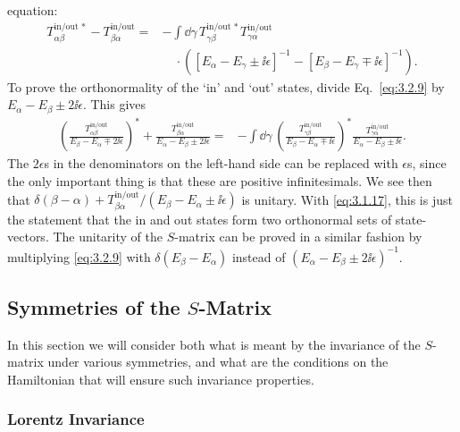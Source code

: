 
equation:
\begin{align}
T_{\alpha\beta}^{\mathrm{in/out}\,*}-T_{\beta\alpha}^{\mathrm{in/out}}
={}&-\int \dd\gamma\,T_{\gamma\beta}^{\mathrm{in/out}\,*}T_{\gamma\alpha}^{\mathrm{in/out}}
\nonumber\\
&\quad\cdot\left([E_\alpha-E_\gamma\pm \ii\epsilon]^{-1}
-[E_\beta-E_\gamma\mp \ii\epsilon]^{-1}\right).
\tag{3.2.9}\label{eq:3.2.9}
\end{align}
To prove the orthonormality of the `in' and `out' states, divide Eq.~\eqref{eq:3.2.9}
by $E_\alpha-E_\beta\pm2\ii\epsilon$. This gives
\begin{align*}
\left(\frac{T_{\alpha\beta}^{\mathrm{in/out}}}{E_\beta-E_\alpha\mp2\ii\epsilon}\right)^*
+\frac{T_{\beta\alpha}^{\mathrm{in/out}}}{E_\alpha-E_\beta\pm2\ii\epsilon}
={}&-\int \dd\gamma\,
\left(\frac{T_{\gamma\beta}^{\mathrm{in/out}}}{E_\beta-E_\alpha\mp \ii\epsilon}\right)^*
\frac{T_{\gamma\alpha}^{\mathrm{in/out}}}{E_\alpha-E_\beta\pm \ii\epsilon}.
\end{align*}
The $2\epsilon$s in the denominators on the left-hand side can be replaced with
$\epsilon$s, since the only important thing is that these are positive infinitesimals.
We see then that $\delta(\beta-\alpha)+T_{\beta\alpha}^{\mathrm{in/out}}/(E_\beta-E_\alpha
\pm \ii\epsilon)$ is unitary. With \eqref{eq:3.1.17}, this is just the statement that the
in and out states form two orthonormal sets of state-vectors. The unitarity of the
$S$-matrix can be proved in a similar fashion by multiplying \eqref{eq:3.2.9} with
$\delta(E_\beta-E_\alpha)$ instead of $(E_\alpha-E_\beta\pm2\ii\epsilon)^{-1}$.

\subsection{\texorpdfstring{Symmetries of the $S$-Matrix}{Symmetries of the S-Matrix}}

In this section we will consider both what is meant by the invariance of the
$S$-matrix under various symmetries, and what are the conditions on the Hamiltonian
that will ensure such invariance properties.

\subsubsection*{Lorentz Invariance}

